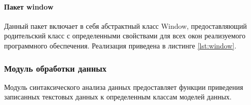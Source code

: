 
\paragraph{Пакет window \newline}
Данный пакет включает в себя абстрактный класс Window, предоставляющий родительский класс с определенными свойствами для всех окон реализуемого программного обеспечения. Реализация приведена в листинге \ref{lst:window}.
\subsubsection{Модуль обработки данных}
Модуль синтаксического анализа данных предоставляет функции приведения записанных текстовых данных к определенным классам моделей данных.

